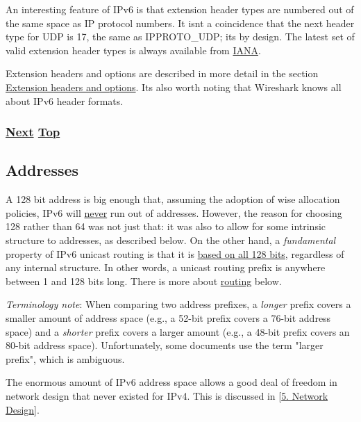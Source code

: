 \documentclass[
]{article}
\begin{document}
An interesting feature of IPv6 is that extension header types are
numbered out of the same space as IP protocol numbers. It
isn\textquotesingle t a coincidence that the next header type for UDP is
17, the same as IPPROTO\_UDP; it\textquotesingle s by design. The latest
set of valid extension header types is always available from
\href{https://www.iana.org/assignments/ipv6-parameters/ipv6-parameters.xhtml}{IANA}.

Extension headers and options are described in more detail in the
section \hyperref[extension-headers-and-options]{Extension headers and
options}. It\textquotesingle s also worth noting that Wireshark knows
all about IPv6 header formats.

\subsubsection{\texorpdfstring{\hyperref[addresses]{Next}
\hyperref[ipv6-basic-technology]{Top}}{Next Top}}\label{next-top-1}

\pagebreak

\subsection{Addresses}\label{addresses}

A 128 bit address is big enough that, assuming the adoption of wise
allocation policies, IPv6 will \href{https://m.xkcd.com/865/}{never} run
out of addresses. However, the reason for choosing 128 rather than 64
was not just that: it was also to allow for some intrinsic structure to
addresses, as described below. On the other hand, a \emph{fundamental}
property of IPv6 unicast routing is that it is
\href{http://www.rfc-editor.org/info/bcp198}{based on all 128 bits},
regardless of any internal structure. In other words, a unicast routing
prefix is anywhere between 1 and 128 bits long. There is more about
\hyperref[routing]{routing} below.

\emph{Terminology note}: When comparing two address prefixes, a
\emph{longer} prefix covers a smaller amount of address space (e.g., a
52-bit prefix covers a 76-bit address space) and a \emph{shorter} prefix
covers a larger amount (e.g., a 48-bit prefix covers an 80-bit address
space). Unfortunately, some documents use the term "larger prefix",
which is ambiguous.

The enormous amount of IPv6 address space allows a good deal of freedom
in network design that never existed for IPv4. This is discussed in
{[}\hyperref[network-design]{5. Network Design}{]}.
\end{document}
